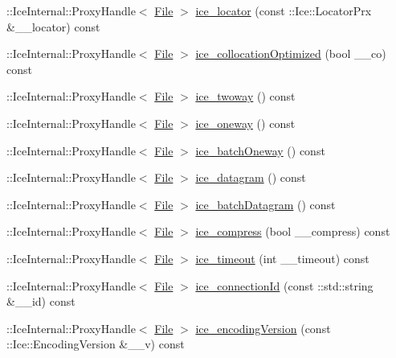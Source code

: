 \begin{DoxyCompactItemize}
\item 
\+::Ice\+Internal\+::\+Proxy\+Handle$<$ \hyperlink{class_ice_proxy_1_1_file_system_1_1_file}{File} $>$ \hyperlink{class_ice_proxy_1_1_file_system_1_1_file_ab25a612a30fcc95d900e86904583d04a}{ice\+\_\+locator} (const \+::Ice\+::\+Locator\+Prx \&\+\_\+\+\_\+locator) const 
\item 
\+::Ice\+Internal\+::\+Proxy\+Handle$<$ \hyperlink{class_ice_proxy_1_1_file_system_1_1_file}{File} $>$ \hyperlink{class_ice_proxy_1_1_file_system_1_1_file_aa943238e04ae0128257fa5973f93b11e}{ice\+\_\+collocation\+Optimized} (bool \+\_\+\+\_\+co) const 
\item 
\+::Ice\+Internal\+::\+Proxy\+Handle$<$ \hyperlink{class_ice_proxy_1_1_file_system_1_1_file}{File} $>$ \hyperlink{class_ice_proxy_1_1_file_system_1_1_file_adab2640dc5d33f6c615fac4575b5142e}{ice\+\_\+twoway} () const 
\item 
\+::Ice\+Internal\+::\+Proxy\+Handle$<$ \hyperlink{class_ice_proxy_1_1_file_system_1_1_file}{File} $>$ \hyperlink{class_ice_proxy_1_1_file_system_1_1_file_aabeba76987c24579c2ac4a9ba727a827}{ice\+\_\+oneway} () const 
\item 
\+::Ice\+Internal\+::\+Proxy\+Handle$<$ \hyperlink{class_ice_proxy_1_1_file_system_1_1_file}{File} $>$ \hyperlink{class_ice_proxy_1_1_file_system_1_1_file_aa2a5d3fd50fe2d07bc8d7b7aa8ba49bf}{ice\+\_\+batch\+Oneway} () const 
\item 
\+::Ice\+Internal\+::\+Proxy\+Handle$<$ \hyperlink{class_ice_proxy_1_1_file_system_1_1_file}{File} $>$ \hyperlink{class_ice_proxy_1_1_file_system_1_1_file_a99f0b30950f373c58397c4305c4a0ba1}{ice\+\_\+datagram} () const 
\item 
\+::Ice\+Internal\+::\+Proxy\+Handle$<$ \hyperlink{class_ice_proxy_1_1_file_system_1_1_file}{File} $>$ \hyperlink{class_ice_proxy_1_1_file_system_1_1_file_a48408814af9847d40b3b79c2bb96d3a8}{ice\+\_\+batch\+Datagram} () const 
\item 
\+::Ice\+Internal\+::\+Proxy\+Handle$<$ \hyperlink{class_ice_proxy_1_1_file_system_1_1_file}{File} $>$ \hyperlink{class_ice_proxy_1_1_file_system_1_1_file_a1423abee4481906a8c162e9f8dc5c7aa}{ice\+\_\+compress} (bool \+\_\+\+\_\+compress) const 
\item 
\+::Ice\+Internal\+::\+Proxy\+Handle$<$ \hyperlink{class_ice_proxy_1_1_file_system_1_1_file}{File} $>$ \hyperlink{class_ice_proxy_1_1_file_system_1_1_file_adade9ef50df4d34c413c166e1f6bb85c}{ice\+\_\+timeout} (int \+\_\+\+\_\+timeout) const 
\item 
\+::Ice\+Internal\+::\+Proxy\+Handle$<$ \hyperlink{class_ice_proxy_1_1_file_system_1_1_file}{File} $>$ \hyperlink{class_ice_proxy_1_1_file_system_1_1_file_a80fdb76254f6f4e649d075aca4c7d835}{ice\+\_\+connection\+Id} (const \+::std\+::string \&\+\_\+\+\_\+id) const 
\item 
\+::Ice\+Internal\+::\+Proxy\+Handle$<$ \hyperlink{class_ice_proxy_1_1_file_system_1_1_file}{File} $>$ \hyperlink{class_ice_proxy_1_1_file_system_1_1_file_abe0b63d553e9e64e8d088ae53dfeb47d}{ice\+\_\+encoding\+Version} (const \+::Ice\+::\+Encoding\+Version \&\+\_\+\+\_\+v) const 
\end{DoxyCompactItemize}
